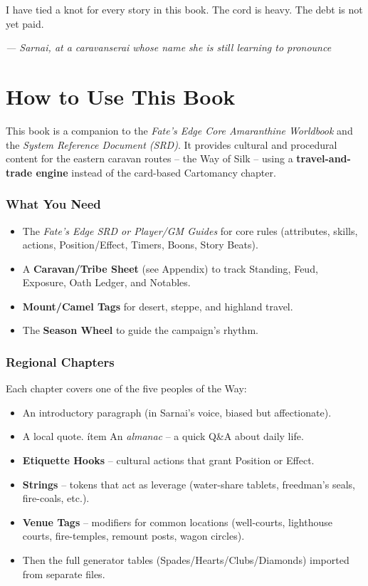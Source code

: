 \documentclass[12pt,oneside]{book}
\begin{document}
I have tied a knot for every story in this book. The cord is heavy. The debt is not yet paid.

\vspace{1em}
\noindent\textit{--- Sarnai, at a caravanserai whose name she is still learning to pronounce}

\chapter*{How to Use This Book}

This book is a companion to the \textit{Fate's Edge Core Amaranthine Worldbook} and the \textit{System Reference Document (SRD)}. It provides cultural and procedural content for the eastern caravan routes -- the Way of Silk -- using a \textbf{travel-and-trade engine} instead of the card-based Cartomancy chapter.

\subsection*{What You Need}
\begin{itemize}
  \item The \textit{Fate's Edge SRD or Player/GM Guides} for core rules (attributes, skills, actions, Position/Effect, Timers, Boons, Story Beats).
  \item A \textbf{Caravan/Tribe Sheet} (see Appendix) to track Standing, Feud, Exposure, Oath Ledger, and Notables.
  \item \textbf{Mount/Camel Tags} for desert, steppe, and highland travel.
  \item The \textbf{Season Wheel} to guide the campaign's rhythm.
\end{itemize}

\subsection*{Regional Chapters}
Each chapter covers one of the five peoples of the Way:
\begin{itemize}
  \item An introductory paragraph (in Sarnai's voice, biased but affectionate).
  \item A local quote.
  ítem An \emph{almanac} -- a quick Q\&A about daily life.
  \item \textbf{Etiquette Hooks} -- cultural actions that grant Position or Effect.
  \item \textbf{Strings} -- tokens that act as leverage (water-share tablets, freedman's seals, fire-coals, etc.).
  \item \textbf{Venue Tags} -- modifiers for common locations (well-courts, lighthouse courts, fire-temples, remount posts, wagon circles).
  \item Then the full generator tables (Spades/Hearts/Clubs/Diamonds) imported from separate files.
\end{itemize}
\end{document}
